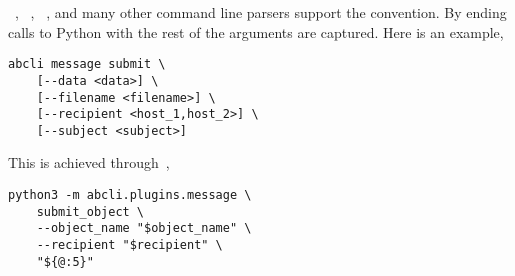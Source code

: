 ~\cite{argparse}, ~\cite{click}, ~\cite{python_fire}, and many other command line parsers support the  convention. By ending calls to Python with  the rest of the arguments are captured. Here is an example,
%
\begin{verbatim}
abcli message submit \
    [--data <data>] \
    [--filename <filename>] \
    [--recipient <host_1,host_2>] \
    [--subject <subject>]
\end{verbatim}
%
This is achieved through~,
%
\begin{verbatim}
python3 -m abcli.plugins.message \
    submit_object \
    --object_name "$object_name" \
    --recipient "$recipient" \
    "${@:5}"
\end{verbatim}
